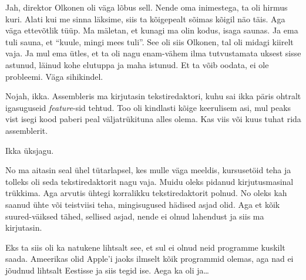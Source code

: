 
Jah, direktor Olkonen oli väga lõbus sell. Nende oma inimestega, ta oli hirmus 
kuri. Alati kui me sinna läksime, siis ta kõigepealt sõimas kõigil näo täis. 
Aga väga ettevõtlik tüüp. Ma mäletan, et kunagi ma olin kodus, isaga saunas. Ja 
ema tuli sauna, et \enquote{kuule, mingi mees tuli}. See oli siis Olkonen, tal 
oli midagi kiirelt vaja. Ja mul ema ütles, et ta oli nagu enam-vähem ilma 
tutvustamata uksest sisse astunud, läinud kohe elutuppa ja maha istunud. Et ta 
võib oodata, ei ole probleemi. Väga sihikindel. 


Nojah, ikka. Assembleris ma kirjutasin tekstiredaktori, kuhu sai ikka päris 
ohtralt igasuguseid \emph{feature}-sid tehtud. Too oli kindlasti kõige 
keerulisem asi, mul peaks vist isegi kood paberi peal väljatrükituna  
alles olema. Kas viis või kuus tuhat rida assemblerit. 


Ikka üksjagu. 


No ma aitasin seal ühel tütarlapsel, kes mulle väga meeldis,  kursusetöid teha 
ja tolleks oli seda tekstiredaktorit nagu vaja. Muidu oleks pidanud 
kirjutusmasinal trükkima. Aga arvutis ühtegi korralikku tekstiredaktorit polnud. No 
oleks kah saanud ühte või teistviisi teha,  mingisugused hädised asjad olid. 
Aga et kõik suured-väiksed tähed, sellised asjad, nende ei olnud lahendust ja siis 
ma kirjutasin.


Eks ta siis oli ka natukene lihtsalt see, et sul ei olnud neid programme 
kuskilt saada. Ameerikas olid Apple'i jaoks ilmselt kõik programmid olemas, aga nad ei jõudnud lihtsalt Eestisse ja siis tegid ise. Aega ka oli ja\ldots


